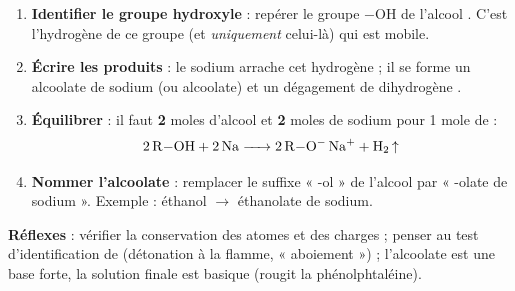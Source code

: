 \documentclass[11pt]{article}
\newcommand{\cle}[1]{{\popxbold\color{popdark}#1}}
\begin{document}
\begin{methode}
\begin{enumerate}
\item \textbf{Identifier le groupe hydroxyle} : repérer le groupe \cle{$-$OH} de l'alcool . C'est l'hydrogène de ce groupe (et \emph{uniquement} celui-là) qui est mobile.
\item \textbf{Écrire les produits} : le sodium arrache cet hydrogène ; il se forme un \cle{alcoolate de sodium} (ou alcoolate)  et un dégagement de \cle{dihydrogène} .
\item \textbf{Équilibrer} : il faut \textbf{2} moles d'alcool et \textbf{2} moles de sodium pour 1 mole de  :
\[ \ce{2 R-OH + 2 Na -> 2 R-O^- Na^+ + H2 ^} \]
\item \textbf{Nommer l'alcoolate} : remplacer le suffixe « -ol » de l'alcool par « -olate de sodium ». Exemple : éthanol $\to$ éthanolate de sodium.
\end{enumerate}
\textbf{Réflexes} : vérifier la conservation des atomes et des charges ; penser au test d'identification de  (détonation à la flamme, « aboiement ») ; l'alcoolate est une base forte, la solution finale est basique (rougit la phénolphtaléine).
\end{methode}
\end{document}
